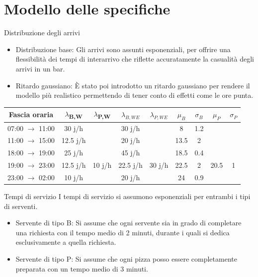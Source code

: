 \documentclass[xcolor=table]{beamer}
\newcommand{\xmark}[0]{\ding{55}}
\begin{document}
\section{Modello delle specifiche}
\begin{frame}{Distribuzione degli arrivi}\justifying

\begin{itemize}
\item Distribuzione base: Gli arrivi sono assunti esponenziali, per offrire una flessibilità dei tempi di interarrivo che riflette accuratamente la casualità degli arrivi in un bar.

\item Ritardo gaussiano: È stato poi introdotto un ritardo gaussiano per rendere il modello più realistico permettendo di tener conto di effetti come le ore punta.
\end{itemize}
\bigskip

\begin{adjustbox}{width=\textwidth}
\begin{tabular}{ |c|c|c|c|c|c|c|c|c| }
\hline
\cellcolor{cellcolor}Fascia oraria & \cellcolor{cellcolor}$\lambda${\textsubscript{B,W}} & \cellcolor{cellcolor}$\lambda${\textsubscript{P,W}} & \cellcolor{cellcolor} $\lambda_{B,WE}$ & \cellcolor{cellcolor} $\lambda_{P,WE}$ & \cellcolor{cellcolor} $\mu_B$ & \cellcolor{cellcolor} $\sigma_B$ & \cellcolor{cellcolor} $\mu_P$ & \cellcolor{cellcolor} $\sigma_P$ \\
\hline
\hline
07:00 $\rightarrow$ 11:00 & 30 j/h & \xmark & 30 j/h & \xmark & 8 & 1.2 & \xmark & \xmark \\
\hline
11:00 $\rightarrow$ 15:00 & 12.5 j/h & \xmark & 20 j/h & \xmark & 13.5 & 2 & \xmark & \xmark \\
\hline
\hline
18:00 $\rightarrow$ 19:00 & 25 j/h & \xmark & 45 j/h & \xmark & 18.5 & 0.4 & \xmark & \xmark \\
\hline
19:00 $\rightarrow$ 23:00 & 12.5 j/h & 10 j/h & 22.5 j/h & 30 j/h & 22.5 & 2 & 20.5 & 1 \\
\hline
23:00 $\rightarrow$ 02:00 & 10 j/h & \xmark & 20 j/h & \xmark & 24 & 0.9 & \xmark & \xmark \\
\hline
\end{tabular} 
\end{adjustbox}
\end{frame}

\begin{frame}{Tempi di servizio}\justifying
I tempi di servizio si assumono esponenziali per entrambi i tipi di serventi.
\begin{itemize}
\item Servente di tipo B: Si assume che ogni servente sia in grado di completare una richiesta con il tempo medio di 2 minuti, durante i quali si dedica esclusivamente a quella richiesta.

\item Servente di tipo P: Si assume che ogni pizza posso essere completamente preparata con un tempo medio di 3 minuti.
\end{itemize}
\end{frame}
\end{document}
